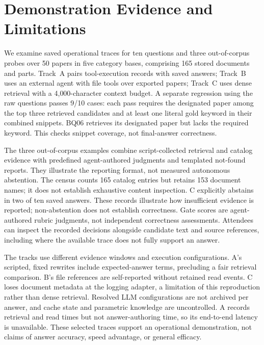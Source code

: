 \section{Demonstration Evidence and Limitations}
\label{sec:eval}

We examine saved operational traces for ten questions and three out-of-corpus
probes over 50 papers in five category bases, comprising 165 stored documents
and parts. Track~A pairs tool-execution records with saved \sys{} answers; Track~B uses an external agent
with file tools over exported papers; Track~C uses dense retrieval with a
4{,}000-character context budget. A separate regression using the raw questions
passes 9/10 cases: each pass requires the designated paper among the top three
retrieved candidates and at least one literal gold keyword in their combined
snippets. BQ06 retrieves its designated paper but lacks the required keyword.
This checks snippet coverage, not final-answer correctness.

The three out-of-corpus examples combine script-collected retrieval and
catalog evidence with predefined agent-authored judgments and templated
not-found reports. They illustrate the reporting format, not measured
autonomous abstention. The census counts 165 catalog entries but retains
153 document names; it does not establish exhaustive content inspection. C explicitly abstains in two of ten saved
answers. These records illustrate how insufficient evidence is reported;
non-abstention does not establish correctness. Gate scores are agent-authored rubric judgments, not independent
correctness assessments. Attendees can inspect the recorded decisions alongside candidate
text and source references, including where the available trace does not
fully support an answer.

The tracks use different evidence windows and execution configurations.
A's scripted, fixed rewrites include expected-answer terms, precluding a fair
retrieval comparison. B's file references are self-reported without retained
read events. C loses document metadata at the logging adapter, a limitation
of this reproduction rather than dense retrieval. Resolved LLM configurations
are not archived per answer, and cache state and parametric knowledge are
uncontrolled. A records retrieval and read times but not answer-authoring time,
so its end-to-end latency is unavailable. These selected traces support an
operational demonstration, not claims of answer accuracy, speed advantage,
or general efficacy.

